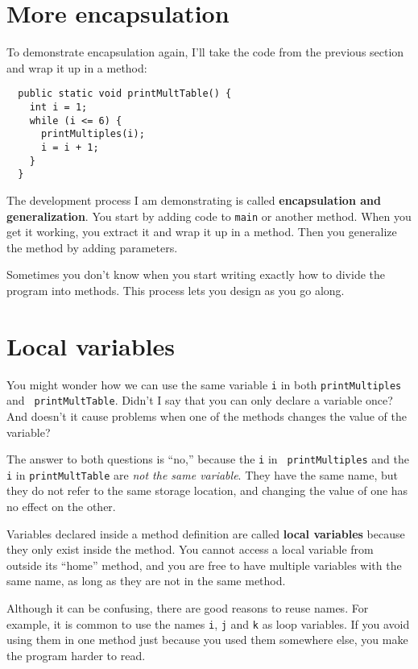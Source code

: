 \documentclass[12pt]{book}
\theoremstyle{definition}
\begin{document}
\section{More encapsulation}

To demonstrate encapsulation again, I'll take the code
from the previous section and wrap it up in a method:

\begin{lstlisting}
  public static void printMultTable() {
    int i = 1;
    while (i <= 6) {
      printMultiples(i);
      i = i + 1;
    }
  }
\end{lstlisting}
%
The development process I am demonstrating is called
{\bf encapsulation and generalization}.
You start by adding
code to {\tt main} or another method.  When you get
it working, you extract it and wrap it up in a method.
Then you generalize the method by adding parameters.

Sometimes you don't know
when you start writing exactly how to divide the program into
methods.  This process lets you design as you go along.


\section{Local variables}

You might wonder how we can use the same
variable {\tt i} in both {\tt printMultiples} and {\tt
printMultTable}.  Didn't I say that you can only declare a variable
once?  And doesn't it cause problems when one of the methods changes
the value of the variable?

The answer to both questions is ``no,'' because the {\tt i} in {\tt
printMultiples} and the {\tt i} in {\tt printMultTable} are
{\em not the same variable}.  They have the same name, but
they do not refer to the same storage location, and changing
the value of one has no effect on the other.

Variables declared inside a method definition are
called {\bf local variables} because they only exist inside
the method.  You cannot access a local variable from outside
its ``home'' method, and you are free to have multiple
variables with the same name, as long as they are not in
the same method.

Although it can be confusing, there are good
reasons to reuse names.  For example, it is common to
use the names {\tt i}, {\tt j} and {\tt k} as loop variables.
If you avoid using them in one method just because you
used them somewhere else, you make the program
harder to read.
\end{document}
